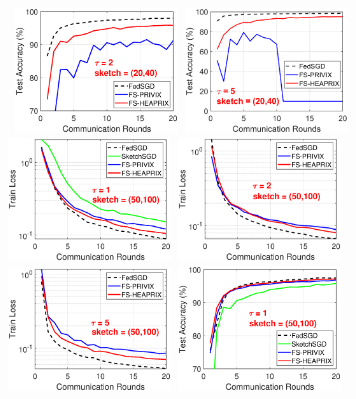 \documentclass[twoside]{article}
\begin{document}
\begin{figure}[H]
\begin{center}
		\mbox{
		\includegraphics[width=1.7in]{MNIST_figures/local2_sketch20_iid1_test_acc.eps} \hspace{-0.2in}
		\includegraphics[width=1.7in]{MNIST_figures/local5_sketch20_iid1_test_acc.eps}\hspace{-0.2in}
		\includegraphics[width=1.7in]{MNIST_figures/local1_sketch50_iid1_train_loss.eps} \hspace{-0.2in}
		\includegraphics[width=1.7in]{MNIST_figures/local2_sketch50_iid1_train_loss.eps} \hspace{-0.2in}
		}
		\mbox{
		\includegraphics[width=1.7in]{MNIST_figures/local5_sketch50_iid1_train_loss.eps}\hspace{-0.2in}
		\includegraphics[width=1.7in]{MNIST_figures/local1_sketch50_iid1_test_acc.eps} \hspace{-0.2in}
}
\end{center}
\end{figure}
\end{document}
